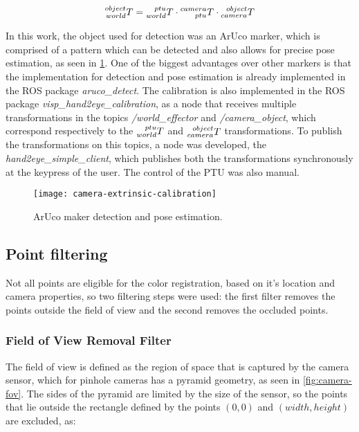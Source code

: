 \begin{equation}
    \label{eqn:hand-in-eye-equality}
    \TF{world}{object} = \TF{world}{ptu} \cdot \TF{ptu}{camera} \cdot \TF{camera}{object}
\end{equation}

In this work, the object used for detection was an ArUco marker, which is comprised of a pattern which can be detected and also allows for precise pose estimation, as seen in \cref{fig:aruco-detection}. One of the biggest advantages over other markers is that the implementation for detection and pose estimation is already implemented in the ROS package \emph{aruco\_detect}. The calibration is also implemented in the ROS package \emph{visp\_hand2eye\_calibration}, as a node that receives multiple transformations in the topics \emph{/world\_effector} and \emph{/camera\_object}, which correspond respectively to the $\TF{world}{ptu}$ and $\TF{camera}{object}$ transformations. To publish the transformations on this topics, a node was developed, the \emph{hand2eye\_simple\_client}, which publishes both the transformations synchronously at the keypress of the user. The control of the PTU was also manual. 

\begin{figure}
    
    \centering
    \texttt{[image: camera-extrinsic-calibration]}

    \caption{ArUco maker detection and pose estimation.}
    \label{fig:aruco-detection}
\end{figure}

\subsection{Point filtering}

Not all points are eligible for the color registration, based on it's location and camera properties, so two filtering steps were used: the first filter removes the points outside the field of view and the second removes the occluded points.

\subsubsection{Field of View Removal Filter}

The field of view is defined as the region of space that is captured by the camera sensor, which for pinhole cameras has a pyramid geometry, as seen in \cref{fig:camera-fov}. The sides of the pyramid are limited by the size of the sensor, so the points that lie outside the rectangle defined by the points $(0,0)$ and $(width, height)$ are excluded, as:


